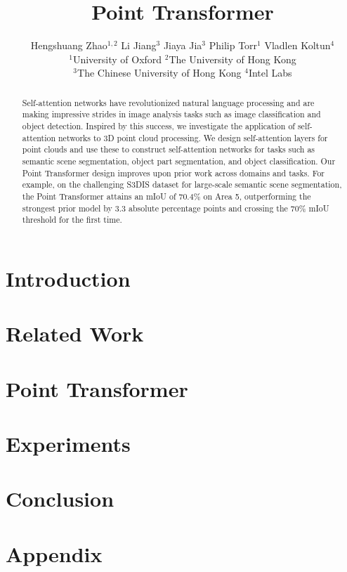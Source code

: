 \documentclass[10pt,twocolumn,letterpaper]{article}
\begin{document}
\title{Point Transformer}

\author{Hengshuang Zhao$^{1,2}$ \quad Li Jiang$^{3}$ \quad Jiaya Jia$^{3}$ \quad Philip Torr$^{1}$ \quad Vladlen Koltun$^{4}$\\
	$^{1}$University of Oxford \quad
	$^{2}$The University of Hong Kong \\
	$^{3}$The Chinese University of Hong Kong \quad
	$^{4}$Intel Labs\\ 
}

\maketitle
\ificcvfinal\thispagestyle{empty}\fi

\begin{abstract}
Self-attention networks have revolutionized natural language processing and are making impressive strides in image analysis tasks such as image classification and object detection. Inspired by this success, we investigate the application of self-attention networks to 3D point cloud processing. We design self-attention layers for point clouds and use these to construct self-attention networks for tasks such as semantic scene segmentation, object part segmentation, and object classification. Our Point Transformer design improves upon prior work across domains and tasks. For example, on the challenging S3DIS dataset for large-scale semantic scene segmentation, the Point Transformer attains an mIoU of 70.4\% on Area 5, outperforming the strongest prior model by 3.3 absolute percentage points and crossing the 70\% mIoU threshold for the first time.
\end{abstract}

\section{Introduction}
\label{sec:introduction}


\section{Related Work}
\label{sec:related}


\section{Point Transformer}
\label{sec:method}


\section{Experiments}
\label{sec:experiments}


\section{Conclusion}
\label{sec:conclusion}


\appendix
\section{Appendix}
\label{sec:appendix}


\balance

{\small
	
	
}
\end{document}
